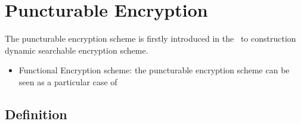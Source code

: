 \section{Puncturable Encryption}

The puncturable encryption scheme is firstly introduced in the~\cite{SP:GreMie15} to construction dynamic searchable encryption scheme.

\begin{itemize}
    \item Functional Encryption scheme: the puncturable encryption scheme can be seen as a particular case of 
\end{itemize}

\subsection{Definition}

